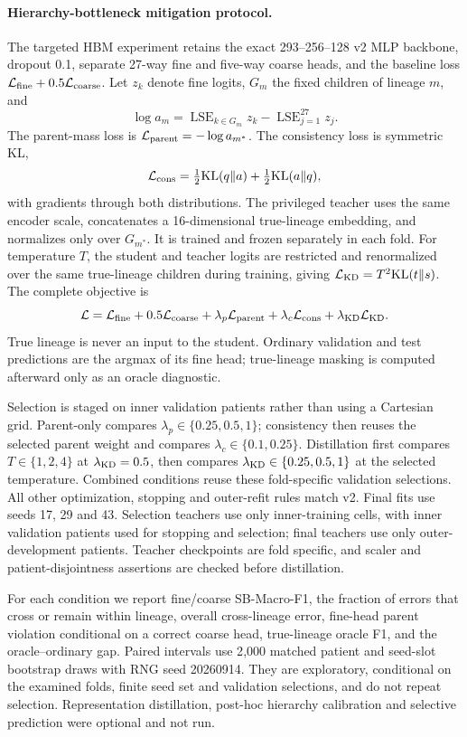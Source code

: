\paragraph{Hierarchy-bottleneck mitigation protocol.}
\label{sec:appendix:hbm}
The targeted HBM experiment retains the exact 293--256--128 v2 MLP backbone,
dropout 0.1, separate 27-way fine and five-way coarse heads, and the baseline
loss $\mathcal L_{\rm fine}+0.5\mathcal L_{\rm coarse}$. Let $z_k$ denote fine
logits, $G_m$ the fixed children of lineage $m$, and
\[
\log a_m=\operatorname{LSE}_{k\in G_m}z_k-
          \operatorname{LSE}_{j=1}^{27}z_j.
\]
The parent-mass loss is $\mathcal L_{\rm parent}=-\log a_{m^*}$.
The consistency loss is symmetric KL,
\[
\mathcal L_{\rm cons}=\tfrac12\mathrm{KL}(q\Vert a)
                     +\tfrac12\mathrm{KL}(a\Vert q),
\]
with gradients through both distributions. The privileged teacher uses the
same encoder scale, concatenates a 16-dimensional true-lineage embedding, and
normalizes only over $G_{m^*}$. It is trained and frozen separately in each
fold. For temperature $T$, the student and teacher logits are restricted and
renormalized over the same true-lineage children during training, giving
$\mathcal L_{\rm KD}=T^2\mathrm{KL}(t\Vert s)$. The complete objective is
\[
\mathcal L=\mathcal L_{\rm fine}+0.5\mathcal L_{\rm coarse}
+\lambda_p\mathcal L_{\rm parent}
+\lambda_c\mathcal L_{\rm cons}
+\lambda_{\rm KD}\mathcal L_{\rm KD}.
\]
True lineage is never an input to the student. Ordinary validation and test
predictions are the argmax of its fine head; true-lineage masking is computed
afterward only as an oracle diagnostic.

Selection is staged on inner validation patients rather than using a Cartesian
grid. Parent-only compares $\lambda_p\in\{0.25,0.5,1\}$; consistency then
reuses the selected parent weight and compares
$\lambda_c\in\{0.1,0.25\}$. Distillation first compares
$T\in\{1,2,4\}$ at $\lambda_{\rm KD}=0.5$, then compares
$\lambda_{\rm KD}\in\{0.25,0.5,1\}$ at the selected temperature. Combined
conditions reuse these fold-specific validation selections. All other
optimization, stopping and outer-refit rules match v2. Final fits use seeds
17, 29 and 43. Selection teachers use only inner-training cells, with inner
validation patients used for stopping and selection; final teachers use only
outer-development patients. Teacher checkpoints are fold specific, and scaler
and patient-disjointness assertions are checked before distillation.

For each condition we report fine/coarse SB-Macro-F1, the fraction of errors
that cross or remain within lineage, overall cross-lineage error, fine-head
parent violation conditional on a correct coarse head, true-lineage oracle F1,
and the oracle--ordinary gap. Paired intervals use 2{,}000 matched patient and
seed-slot bootstrap draws with RNG seed 20260914. They are exploratory,
conditional on the examined folds, finite seed set and validation selections,
and do not repeat selection. Representation distillation, post-hoc hierarchy
calibration and selective prediction were optional and not run.

